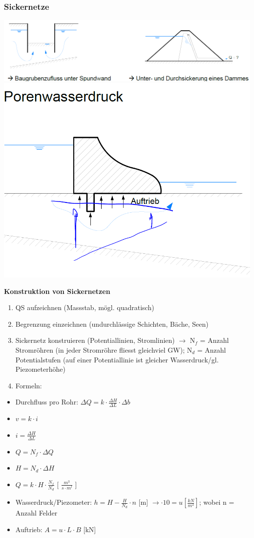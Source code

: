 	\begin{minipage}{\linewidth}
		
		\subsubsection{Sickernetze}
		
		\includegraphics[width=0.6\linewidth]{images/GW15Sickerwassermenge.PNG}
		\includegraphics[width=0.2\linewidth]{images/GW16Porenwasserdruck.PNG}		\\
	\end{minipage}
\begin{minipage}{0.5\linewidth}
		
		\textbf{Konstruktion von Sickernetzen}
		\begin{enumerate}
			\item QS aufzeichnen (Massstab, mögl. quadratisch)
			\item Begrenzung einzeichnen (undurchlässige Schichten, Bäche, Seen)
			\item Sickernetz konstruieren (Potentiallinien, Stromlinien)
					$ \rightarrow $ N$_f$ = Anzahl Stromröhren (in jeder Stromröhre fliesst gleichviel GW); N$_d$ = Anzahl Potentialstufen (auf einer Potentiallinie ist gleicher Wasserdruck/gl. Piezometerhöhe)
			\item Formeln:			
		\end{enumerate}
		\begin{itemize}
			\item Durchfluss pro Rohr: $ \Delta Q = k \cdot \frac{\Delta H}{\Delta L} \cdot \Delta b $
			\item $ v = k \cdot i $
			\item $ i = \frac{\Delta H}{\Delta L} $
			\item $ Q = N_f \cdot \Delta Q $
			\item $ H = N_d \cdot \Delta H $
			\item $ Q = k \cdot H \cdot \frac{N_f}{N_d} $ [ $ \frac{m^3}{s \cdot m^l} $ ]
			\item Wasserdruck/Piezometer: $ h = H - \frac{H}{N_d} \cdot n $ [m] $ \rightarrow \cdot 10 = u [\frac{kN}{m^2}] $; wobei n = Anzahl Felder
			\item Auftrieb: $ A = u \cdot L \cdot B $ [kN]
		\end{itemize}
	
\end{minipage}
